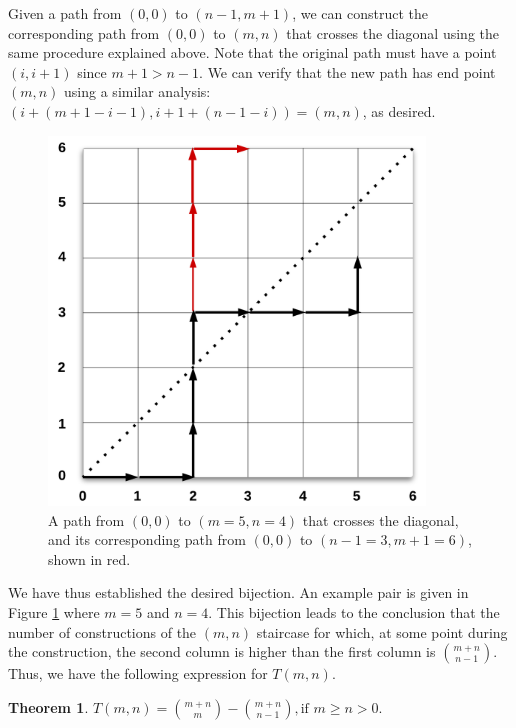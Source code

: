 \documentclass[12pt]{amsart}
\newtheorem{theorem}{Theorem}[section]
\begin{document}
Given a path from $(0,0)$ to $(n-1,m+1)$, we can construct the corresponding path from $(0,0)$ to $(m,n)$ that crosses the diagonal using the same procedure explained above. Note that the original path must have a point $(i,i+1)$ since $m+1>n-1$. We can verify that the new path has end point $(m,n)$ using a similar analysis: $(i+(m+1-i-1),i+1+(n-1-i)) = (m,n)$, as desired.

\begin{figure}
\includegraphics[width=10cm]{reflection.png}
\caption{A path from $(0,0)$ to $(m=5, n=4)$ that crosses the diagonal, and its corresponding path from $(0,0)$ to $(n-1=3, m+1=6)$, shown in red.}
\label{fig:reflection}
\end{figure}

We have thus established the desired bijection. An example pair is given in Figure \ref{fig:reflection} where $m=5$ and $n=4$. This bijection leads to the conclusion that the number of constructions of the $(m,n)$ staircase for which, at some point during the construction, the second column is higher than the first column is $\binom{m+n}{n-1}$. Thus, we have the following expression for $T(m,n)$.

\begin{theorem}
$T(m,n) = \binom{m+n}{m} - \binom{m+n}{n-1}, \text{if $m \geq n > 0$.}$
\end{theorem}
\end{document}
